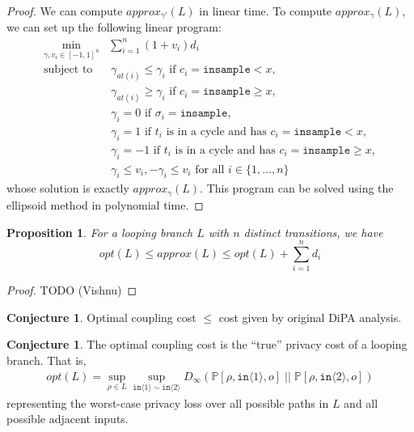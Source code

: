 \documentclass[12pt]{article}
\newcommand{\PP}{\mathbb{P}}
\newcommand{\gguard}[1][x]{\texttt{insample}\geq #1}
\newcommand{\lguard}[1][x]{\texttt{insample} < #1}
\newcommand{\brangle}[1]{\langle #1 \rangle}
\newtheorem{prop}[thm]{Proposition}
\theoremstyle{definition}
\newtheorem{conj}[thm]{Conjecture}
\begin{document}
\begin{proof}
    We can compute $approx_{\gamma'}(L)$ in linear time. To compute $approx_\gamma(L)$, we can set up the following linear program: 
    \begin{align*}
        \min_{\gamma, v_i \in [-1, 1]^n} &\sum_{i = 1}^n \left(1 + v_i \right) d_i \\ 
            \text{subject to } 
            &\ \gamma_{at(i)} \leq \gamma_i \text{ if } c_i = \lguard, \\
            &\ \gamma_{at(i)} \geq \gamma_i \text{ if } c_i = \gguard, \\
            &\ \gamma_i = 0 \text{ if } \sigma_i = \texttt{insample}, \\
            &\ \gamma_i = 1 \text{ if } t_i \text{ is in a cycle and has } c_i = \lguard,\\ 
            &\ \gamma_i = -1 \text{ if } t_i \text{ is in a cycle and has } c_i = \gguard,\\
            &\ \gamma_i \leq v_i, -\gamma_i \leq v_i \text{ for all } i \in \{1, \dots, n\} 
    \end{align*}
    whose solution is exactly $approx_\gamma(L)$. This program can be solved using the ellipsoid method in polynomial time.
\end{proof}

\begin{prop}
    For a looping branch $L$ with $n$ distinct transitions, we have 
    \[opt(L) \leq approx(L) \leq opt(L) + \sum_{i = 1}^n d_i \]
\end{prop}

\begin{proof}
    TODO (Vishnu)
\end{proof}

\begin{conj}
    Optimal coupling cost $\leq$ cost given by original DiPA analysis.
\end{conj}

\begin{conj}
    The optimal coupling cost is the ``true'' privacy cost of a looping branch. That is, 
    \begin{align*}
        opt(L) = \sup_{\rho \in L} \sup_{\texttt{in}\brangle{1} \sim \texttt{in}\brangle{2}} D_\infty(\PP[\rho, \texttt{in}\brangle{1}, o]\; ||\; \PP[\rho, \texttt{in}\brangle{2}, o])
    \end{align*}
    representing the worst-case privacy loss over all possible paths in $L$ and all possible adjacent inputs.
\end{conj}
\end{document}
